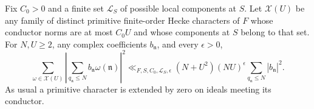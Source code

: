 \begin{lemma}\label{lem:conductor-sieve}
Fix \(C_0>0\) and a finite set \(\mathscr L_S\) of possible local components at \(S\).
Let \(\mathscr X(U)\) be any family of distinct primitive finite-order
Hecke characters of \(F\) whose conductor norms are at most \(C_0U\)
and whose components at \(S\) belong to that set.  For \(N,U\ge2\),
any complex coefficients \(b_{\mathfrak n}\), and every \(\epsilon>0\),
\begin{equation}
 \sum_{\omega\in\mathscr X(U)}
 \left|\sum_{q_{\mathfrak n}\le N}
               b_{\mathfrak n}\omega(\mathfrak n)\right|^2
 \ll_{F,S,C_0,\mathscr L_S,\epsilon}
       (N+U^2)(NU)^\epsilon
       \sum_{q_{\mathfrak n}\le N}|b_{\mathfrak n}|^2 .
\label{eq:conductor-sieve}
\end{equation}
As usual a primitive character is extended by zero on ideals meeting
its conductor.
\end{lemma}

